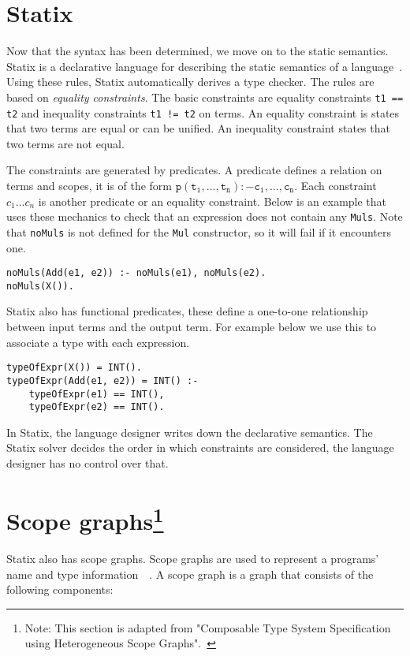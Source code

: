 \section{Statix}
Now that the syntax has been determined, we move on to the static semantics. Statix is a declarative language for describing the static semantics of a language~\cite{scopes_as_types}. Using these rules, Statix automatically derives a type checker. The rules are based on \emph{equality constraints}. The basic constraints
are equality constraints \verb|t1 == t2| and inequality constraints \verb|t1 != t2| on terms. An equality constraint is states that two terms are equal or can be unified. An inequality constraint states that two terms are not equal. 

The constraints are generated by predicates. A predicate defines a relation on terms and scopes, it is of the form $\mathtt{p(t_1, ..., t_n) :- c_1, ..., c_n}$. Each constraint $c_1...c_n$ is another predicate or an equality constraint. Below is an example that uses these mechanics to check that an expression does not contain any \verb|Muls|. Note that \verb|noMuls| is not defined for the \verb|Mul| constructor, so it will fail if it encounters one.
\begin{lstlisting}
noMuls(Add(e1, e2)) :- noMuls(e1), noMuls(e2).
noMuls(X()).
\end{lstlisting}

Statix also has functional predicates, these define a one-to-one relationship between input terms and the output term. For example below we use this to associate a type with each expression.
\begin{lstlisting}
typeOfExpr(X()) = INT().
typeOfExpr(Add(e1, e2)) = INT() :-
	typeOfExpr(e1) == INT(),
	typeOfExpr(e2) == INT().
\end{lstlisting}

In Statix, the language designer writes down the declarative semantics. The Statix solver decides the order in which constraints are considered, the language designer has no control over that.

\section[Scope graphs]{\label{sec:statix}Scope graphs\protect\footnote{Note: This section is adapted from "Composable Type System Specification using Heterogeneous Scope Graphs".~\cite[sect. 4.1.2]{Zwaan21}}}

Statix also has scope graphs. Scope graphs are used to represent a programs' name and type information~\cite{scopes_as_types}~\cite{nameres}. A scope graph is a graph that consists of the following components:


